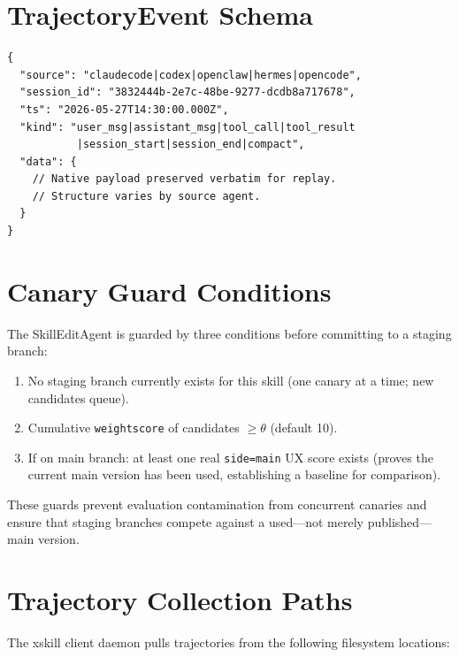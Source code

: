 \documentclass{article}
\begin{document}
\section{TrajectoryEvent Schema}
\label{app:trajevent}

\begin{verbatim}
{
  "source": "claudecode|codex|openclaw|hermes|opencode",
  "session_id": "3832444b-2e7c-48be-9277-dcdb8a717678",
  "ts": "2026-05-27T14:30:00.000Z",
  "kind": "user_msg|assistant_msg|tool_call|tool_result
           |session_start|session_end|compact",
  "data": {
    // Native payload preserved verbatim for replay.
    // Structure varies by source agent.
  }
}
\end{verbatim}

\section{Canary Guard Conditions}
\label{app:canary-guards}

The SkillEditAgent is guarded by three conditions before committing to a staging branch:
\begin{enumerate}
    \item No staging branch currently exists for this skill (one canary at a time; new candidates queue).
    \item Cumulative \texttt{weightscore} of candidates $\geq \theta$ (default 10).
    \item If on main branch: at least one real \texttt{side=main} UX score exists (proves the current main version has been used, establishing a baseline for comparison).
\end{enumerate}

These guards prevent evaluation contamination from concurrent canaries and ensure that staging branches compete against a used---not merely published---main version.

\section{Trajectory Collection Paths}
\label{app:paths}

The xskill client daemon pulls trajectories from the following filesystem locations:
\end{document}
